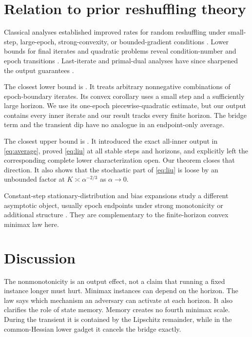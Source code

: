 \documentclass{article}
\theoremstyle{remark}
\newcommand{\1}{\mathbf 1}
\begin{document}
\section{Relation to prior reshuffling theory}

Classical analyses established improved rates for random reshuffling under small-step, large-epoch, strong-convexity, or bounded-gradient conditions \citep{gurbuzbalaban2021why,nagaraj2019sgd,haochen2019random, mishchenko2020random,nguyen2021unified}. Lower bounds for final iterates and quadratic problems reveal condition-number and epoch transitions \citep{safran2020how,safran2021many}. Last-iterate and primal-dual analyses have since sharpened the output guarantees \citep{liu2024last,cai2024tighter}.

The closest lower bound is \citet{cha2023tighter}. It treats arbitrary nonnegative combinations of epoch-boundary iterates. Its convex corollary uses a small step and a sufficiently large horizon. We use its one-epoch piecewise-quadratic estimate, but our output contains every inner iterate and our result tracks every finite horizon. The bridge term and the transient dip have no analogue in an endpoint-only average.

The closest upper bound is \citet{liu2026dominates}. It introduced the exact all-inner output in \eqref{eq:average}, proved \eqref{eq:liu} at all stable steps and horizons, and explicitly left the corresponding complete lower characterization open. Our theorem closes that direction. It also shows that the stochastic part of \eqref{eq:liu} is loose by an unbounded factor at $K\asymp\alpha^{-2/3}$ as $\alpha\to0$.

Constant-step stationary-distribution and bias expansions study a different asymptotic object, usually epoch endpoints under strong monotonicity or additional structure \citep{emmanouilidis2026shuffling}. They are complementary to the finite-horizon convex minimax law here.

\section{Discussion}

The nonmonotonicity is an output effect, not a claim that running a fixed instance longer must hurt. Minimax instances can depend on the horizon. The law says which mechanism an adversary can activate at each horizon. It also clarifies the role of state memory. Memory creates no fourth minimax scale. During the transient it is contained by the Lipschitz remainder, while in the common-Hessian lower gadget it cancels the bridge exactly.
\end{document}
